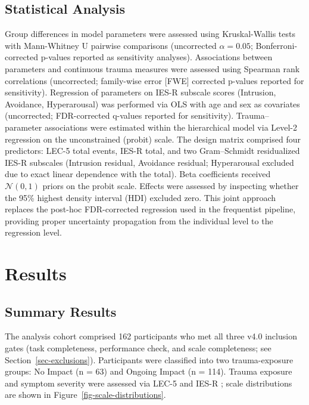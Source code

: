 \documentclass{article}
\begin{document}
\subsection{Statistical Analysis}\label{sec-stats}

Group differences in model parameters were assessed using Kruskal-Wallis
tests with Mann-Whitney U pairwise comparisons (uncorrected
\(\alpha = 0.05\); Bonferroni-corrected p-values reported as sensitivity
analyses). Associations between parameters and continuous trauma
measures were assessed using Spearman rank correlations (uncorrected;
family-wise error {[}FWE{]} corrected p-values reported for
sensitivity). Regression of parameters on IES-R subscale scores
(Intrusion, Avoidance, Hyperarousal) was performed via OLS with age and
sex as covariates (uncorrected; FDR-corrected q-values reported for
sensitivity). Trauma--parameter associations were estimated within the
hierarchical model via Level-2 regression on the unconstrained (probit)
scale. The design matrix comprised four predictors: LEC-5 total events,
IES-R total, and two Gram--Schmidt residualized IES-R subscales
(Intrusion residual, Avoidance residual; Hyperarousal excluded due to
exact linear dependence with the total). Beta coefficients received
\(\mathcal{N}(0, 1)\) priors on the probit scale. Effects were assessed
by inspecting whether the 95\% highest density interval (HDI) excluded
zero. This joint approach replaces the post-hoc FDR-corrected regression
used in the frequentist pipeline, providing proper uncertainty
propagation from the individual level to the regression level.

\section{Results}\label{sec-results}

\subsection{Summary Results}\label{sec-summary-results}

The analysis cohort comprised 162 participants who met all three v4.0
inclusion gates (task completeness, performance check, and scale
completeness; see Section~\ref{sec-exclusions}). Participants were
classified into two trauma-exposure groups: No Impact (n = 63) and
Ongoing Impact (n = 114). Trauma exposure and symptom severity were
assessed via LEC-5 \citep{weathers2013life} and IES-R
\citep{weiss2007impact}; scale distributions are shown in
Figure~\ref{fig-scale-distributions}.
\end{document}
